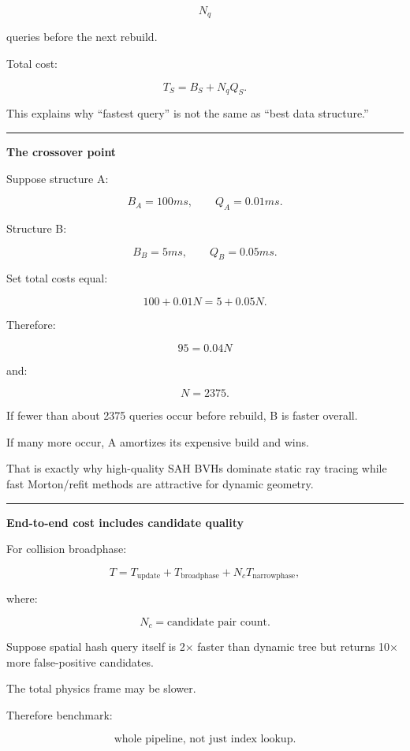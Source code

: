 \[
N_q
\]

queries before the next rebuild.

Total cost:

\[
\boxed{
T_S
=
B_S+N_qQ_S.
}
\]

This explains why ``fastest query'' is not the same as ``best data structure.''

\begin{center}\rule{0.5\linewidth}{0.5pt}\end{center}

\textbf{The crossover point}

Suppose structure A:

\[
B_A=100ms,
\qquad
Q_A=0.01ms.
\]

Structure B:

\[
B_B=5ms,
\qquad
Q_B=0.05ms.
\]

Set total costs equal:

\[
100+0.01N
=
5+0.05N.
\]

Therefore:

\[
95=0.04N
\]

and:

\[
\boxed{
N=2375.
}
\]

If fewer than about 2375 queries occur before rebuild, B is faster overall.

If many more occur, A amortizes its expensive build and wins.

That is exactly why high-quality SAH BVHs dominate static ray tracing while fast Morton/refit methods are attractive for dynamic geometry.

\begin{center}\rule{0.5\linewidth}{0.5pt}\end{center}

\textbf{End-to-end cost includes candidate quality}

For collision broadphase:

\[
T
=
T_{\text{update}}
+
T_{\text{broadphase}}
+
N_cT_{\text{narrowphase}},
\]

where:

\[
N_c
=
\text{candidate pair count}.
\]

Suppose spatial hash query itself is 2× faster than dynamic tree but returns 10× more false-positive candidates.

The total physics frame may be slower.

Therefore benchmark:

\[
\boxed{
\text{whole pipeline, not just index lookup}.
}
\]

